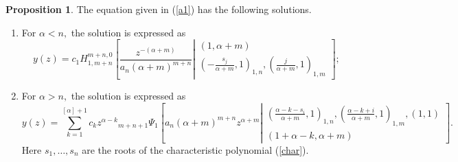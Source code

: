 \documentclass[12pt]{article}
\theoremstyle{definition}
\newtheorem{proposition}{Proposition}
\begin{document}
\begin{proposition}\label{thm1}
The equation given in (\ref{a1}) has the following solutions.
\begin{enumerate}
    \item For $\alpha<n,$ the solution is expressed as
    \begin{equation}\label{uuu2}
    y(z)=c_1H_{1,m+n}^{m+n,0} \left[ \frac{z^{-(\alpha+m)}}{a_n(\alpha+m)^{m+n}} \left| \begin{matrix}
( 1 , \alpha+m )  \\
\left( -\frac{s_j}{\alpha+m} , 1 \right)_{1,n}, \left(\frac{j}{\alpha+m} , 1  \right)_{1,m}   \end{matrix}\right.\right];  
    \end{equation}
    \item For $\alpha>n,$ the solution is expressed as
    \begin{equation}\label{uuu3}
        y(z)=\sum_{k=1}^{[\alpha]+1} c_kz^{\alpha-k} {}_{m+n+1}\Psi_1 \left[a_{n}(\alpha+m)^{m+n}z^{\alpha+m}\left|\begin{matrix}\left( \frac{\alpha-k-s_i}{\alpha+m} , 1 \right)_{1,n}, \left(\frac{\alpha-k+i}{\alpha+m},1\right)_{1,m} , ( 1 , 1 )\\ 
( 1+\alpha-k , \alpha+m )  \end{matrix}\right.\right].
    \end{equation}
Here  $s_1,\dots,s_n$ are the roots of the characteristic polynomial (\ref{char}). 
\end{enumerate}
\end{proposition}
\end{document}

